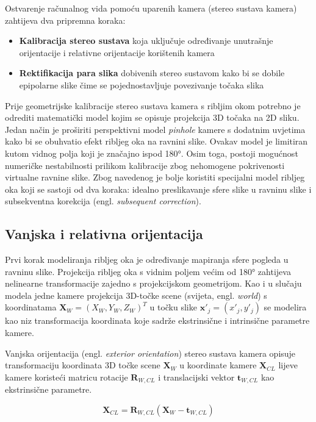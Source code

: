 \documentclass[../seminar.tex]{subfiles}
\begin{document}
Ostvarenje računalnog vida pomoću uparenih kamera (stereo sustava kamera) zahtijeva dva pripremna koraka:
\begin{itemize}
\setlength\itemsep{0.5em}
\item \textbf{Kalibracija stereo sustava} koja uključuje određivanje unutrašnje orijentacije i relativne orijentacije korištenih kamera
\item \textbf{Rektifikacija para slika} dobivenih stereo sustavom kako bi se dobile epipolarne slike čime se pojednostavljuje povezivanje točaka slika
\end{itemize}

Prije geometrijske kalibracije stereo sustava kamera s ribljim okom potrebno je odrediti matematički model kojim se opisuje projekcija 3D točaka na 2D sliku. Jedan način je proširiti perspektivni model \textit{pinhole} kamere s dodatnim uvjetima kako bi se obuhvatio efekt ribljeg oka na ravnini slike. Ovakav model je limitiran kutom vidnog polja koji je značajno ispod 180°. Osim toga, postoji mogućnost numeričke nestabilnosti prilikom kalibracije zbog nehomogene pokrivenosti virtualne ravnine slike. Zbog navedenog je bolje koristiti specijalni model ribljeg oka\cite{Abraham} koji se sastoji od dva koraka: idealno preslikavanje sfere slike u ravninu slike i subsekventna korekcija (engl. \textit{subsequent correction}).


\subsection{Vanjska i relativna orijentacija}

Prvi korak modeliranja ribljeg oka je određivanje mapiranja sfere pogleda u ravninu slike. Projekcija ribljeg oka
s vidnim poljem većim od 180° zahtijeva nelinearne transformacije zajedno s projekcijskom geometrijom. Kao i u slučaju modela jedne kamere projekcija 3D-točke scene (svijeta, engl. \textit{world}) s koordinatama $\boldsymbol{X}_W = (X_W,Y_W,Z_W)^T$ u točku slike 
$\boldsymbol{x'}_j = (x'_j,y'_j)$ se modelira kao niz transformacija koordinata koje sadrže ekstrinsične i intrinsične parametre kamere.  


Vanjska orijentacija (engl. \textit{exterior orientation}) stereo sustava kamera opisuje transformaciju koordinata 3D točke scene $\boldsymbol{X}_W$ u koordinate kamere $\boldsymbol{X}_{CL}$ lijeve kamere koristeći matricu rotacije $\boldsymbol{R}_{W,CL}$
i translacijski vektor $\boldsymbol{t}_{W,CL}$ kao ekstrinsične parametre.

\begin{equation}
\label{eq:eq_ext_ori1}
\boldsymbol{X}_{CL} = \boldsymbol{R}_{W,CL}(\boldsymbol{X}_W - \boldsymbol{t}_{W,CL})
\end{equation}
\end{document}
